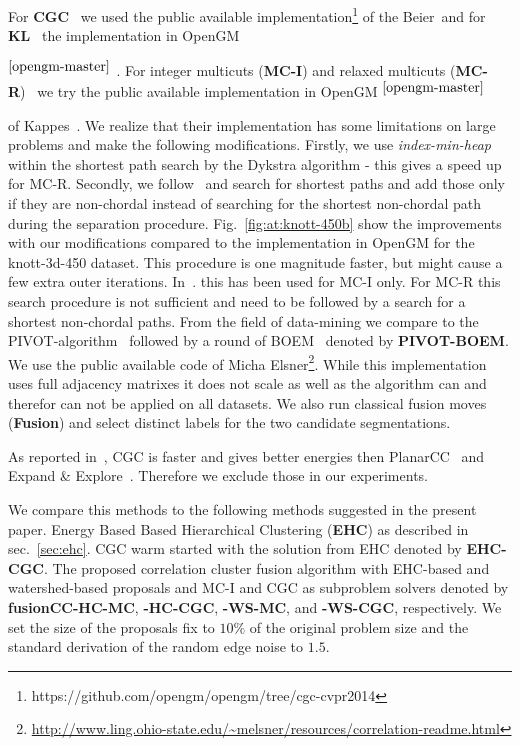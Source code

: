 \documentclass[10pt,twocolumn,letterpaper]{article}
\newcommand{\footlabel}[2]{%
    \addtocounter{footnote}{1}%
    \footnotetext[\thefootnote]{%
        \addtocounter{footnote}{-1}%
        \refstepcounter{footnote}\label{#1}%
        #2%
    }%
    $^{\ref{#1}}$%
}
\newcommand{\footref}[1]{%
    $^{\ref{#1}}$%
}
\theoremstyle{definition}
\begin{document}
For \textbf{CGC}~\cite{beier_2014_cvpr} we used the public available implementation\footnote{\label{opengm-cvpr2014}
\small{{https://github.com/opengm/opengm/tree/cgc-cvpr2014}}
}
of the Beier~\etal and for \textbf{KL}~\cite{Kernighan-1970} the implementation in OpenGM\footlabel{opengm-master}{\url{https://github.com/opengm/opengm}}.
For integer multicuts (\textbf{MC-I}) and relaxed multicuts (\textbf{MC-R})~\cite{kappes_2013_arxiv} we try the public available implementation in OpenGM\footref{opengm-master}
of Kappes~\etal. We realize that their implementation has some limitations on large problems and make the following modifications.
Firstly, we use \emph{index-min-heap}~\cite{Sedgewick-2011} within the shortest path search by the Dykstra algorithm - this gives a speed up for MC-R.
Secondly, we follow~\cite{kroeger_2012_eccv} and search for shortest paths and add those only if they are non-chordal instead of searching for the shortest non-chordal path
during the separation procedure. Fig.~\ref{fig:at:knott-450b} show the improvements with our modifications compared to the implementation in OpenGM for the knott-3d-450 dataset.
This procedure is one magnitude faster, but might cause a few extra outer iterations.
In~\cite{kroeger_2012_eccv}. this has been used for MC-I only. 
For MC-R this search procedure is not sufficient and need to be followed by a search for a shortest non-chordal paths.
From the field of data-mining we compare to the PIVOT-algorithm~\cite{Ailon-2008} followed by a round of BOEM~\cite{Gionis-2007} denoted by \textbf{PIVOT-BOEM}.
We use the public available code of Micha Elsner\footnote{\url{http://www.ling.ohio-state.edu/~melsner/resources/correlation-readme.html}}.
While this implementation uses full adjacency matrixes it does not scale as well as the algorithm can and therefor can not be applied on all datasets.
We also run classical fusion moves~\cite{Lempitsky-2010} (\textbf{Fusion}) and select distinct labels for the two candidate segmentations.

As reported in~\cite{beier_2014_cvpr}, CGC is faster and gives better energies then PlanarCC~\cite{yarkony_2012_eccv} and Expand \& Explore~\cite{bagon_2011_arxiv}.
Therefore we exclude those in our experiments.

We compare this methods to the following methods suggested in the present paper.
%
Energy Based Based Hierarchical Clustering (\textbf{EHC})
as described in sec.~\ref{sec:ehc}.
%
CGC warm started with the solution from EHC denoted by \textbf{EHC-CGC}.
%
The proposed correlation cluster fusion algorithm with EHC-based and watershed-based proposals
 and MC-I and CGC as subproblem solvers denoted by 
\textbf{fusionCC-HC-MC},
\textbf{-HC-CGC},
\textbf{-WS-MC}, and 
\textbf{-WS-CGC}, respectively.
We set the size of the proposals fix to $10\%$ of the original problem size
and the standard derivation of the random edge noise to $1.5$.
\end{document}
